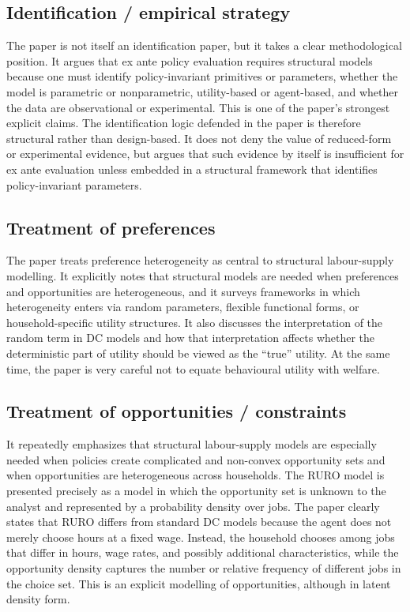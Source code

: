 \documentclass[11pt,a4paper]{article}
\begin{document}
\subsection*{Identification / empirical strategy}
The paper is not itself an identification paper, but it takes a clear methodological position. It argues that ex ante policy evaluation requires structural models because one must identify policy-invariant primitives or parameters, whether the model is parametric or nonparametric, utility-based or agent-based, and whether the data are observational or experimental. This is one of the paper’s strongest explicit claims. The identification logic defended in the paper is therefore structural rather than design-based. It does not deny the value of reduced-form or experimental evidence, but argues that such evidence by itself is insufficient for ex ante evaluation unless embedded in a structural framework that identifies policy-invariant parameters.

\subsection*{Treatment of preferences}
The paper treats preference heterogeneity as central to structural labour-supply modelling. It explicitly notes that structural models are needed when preferences and opportunities are heterogeneous, and it surveys frameworks in which heterogeneity enters via random parameters, flexible functional forms, or household-specific utility structures. It also discusses the interpretation of the random term in DC models and how that interpretation affects whether the deterministic part of utility should be viewed as the “true” utility. At the same time, the paper is very careful not to equate behavioural utility with welfare.

\subsection*{Treatment of opportunities / constraints}
It repeatedly emphasizes that structural labour-supply models are especially needed when policies create complicated and non-convex opportunity sets and when opportunities are heterogeneous across households. The RURO model is presented precisely as a model in which the opportunity set is unknown to the analyst and represented by a probability density over jobs. The paper clearly states that RURO differs from standard DC models because the agent does not merely choose hours at a fixed wage. Instead, the household chooses among jobs that differ in hours, wage rates, and possibly additional characteristics, while the opportunity density captures the number or relative frequency of different jobs in the choice set. This is an explicit modelling of opportunities, although in latent density form.
\end{document}
